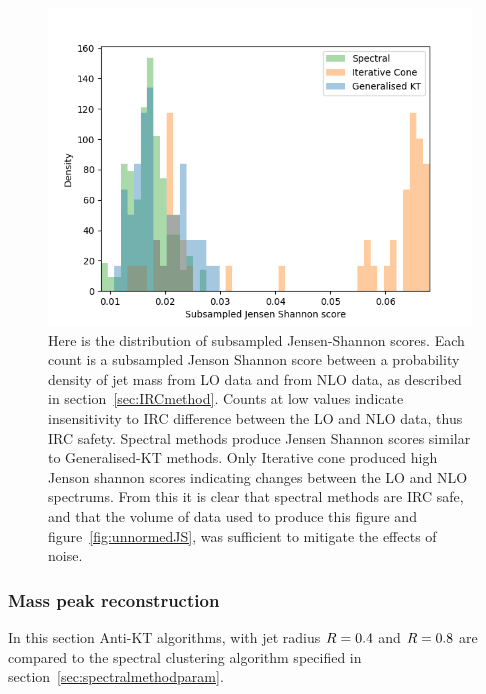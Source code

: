 \begin{figure}[htp]
    \begin{minipage}[c]{0.6\textwidth}
    \includegraphics[width=1.\textwidth]{graphics/JensenShannon.png}
    \end{minipage}\hfill
    \begin{minipage}[c]{0.35\textwidth}
    \caption{Here is the distribution of subsampled Jensen-Shannon scores.
        Each count is a subsampled Jenson Shannon score between a probability density of jet mass from LO data and
        from NLO data, as described in section~\ref{sec:IRCmethod}.
        Counts at low values indicate insensitivity to IRC difference between the LO and NLO data,
        thus IRC safety.
        Spectral methods produce Jensen Shannon scores similar to Generalised-KT
        methods. Only Iterative cone produced high Jenson shannon scores indicating changes
        between the LO and NLO spectrums.
        From this it is clear that spectral methods are IRC safe,
        and that the volume of data used to produce this figure and figure~\ref{fig:unnormedJS},
        was sufficient to mitigate the effects of noise.
    }
    \end{minipage}
\end{figure}    


\FloatBarrier{}
\subsubsection{Mass peak reconstruction}
In this section Anti-KT algorithms, with jet radius \(R{} = 0.4\) and \(R{} = 0.8\)
are compared to the spectral clustering algorithm specified in section~\ref{sec:spectralmethodparam}.


